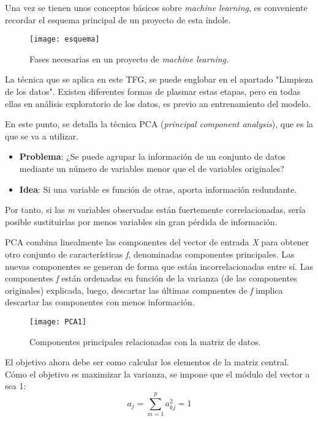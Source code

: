 Una vez se tienen unos conceptos básicos sobre \textit{machine learning}, es conveniente recordar el esquema principal de un proyecto de esta índole.

\begin{figure}[h]
	\centering
	\texttt{[image: esquema]}
	\caption{Fases necesarias en un proyecto de \textit{machine learning.}}
	\label{fig:esquema}
\end{figure}

La técnica que se aplica en este TFG, se puede englobar en el apartado "Limpieza de los datos". Existen diferentes formas de plasmar estas etapas, pero en todas ellas en análisis exploratorio de los datos, es previo an entrenamiento del modelo. \par 

En este punto, se detalla la técnica PCA (\textit{principal component analysis}), que es la que se va a utilizar.\par 

\begin{itemize}
	\item \textbf{Problema}: ¿Se puede agrupar la información de un conjunto de datos mediante un número de variables menor que el de variables originales?
	\item \textbf{Idea}: Si una variable es función de otras, aporta información redundante.
\end{itemize}

Por tanto, si las \textit{m} variables observadas están fuertemente correlacionadas, sería posible sustituirlas por menos variables sin gran pérdida de información.\cite{carlosiii}\par 

PCA combina linealmente las componentes del vector de entrada \textit{X} para obtener otro conjunto de características \textit{f}, denominadas componentes principales. Las nuevas componentes se generan de forma que están incorrelacionadas entre sí.\cite{PCA}
Las componentes \textit{f} están ordenadas en función de la varianza (de las componentes originales) explicada, luego, descartar las últimas compnentes de \textit{f} implica descartar las componentes con menos información.

\begin{figure}[h]
	\centering
	\texttt{[image: PCA1]}
	\caption{Componentes principales relacionadas con la matriz de datos.}
	\label{fig:matriz}
\end{figure}

El objetivo ahora debe ser como calcular los elementos de la matriz central. Cómo el objetivo es maximizar la varianza, se impone que el módulo del vector a sea 1:\cite{PCA}
\begin{equation}\label{eq:vector_a}
	a_{j} = \sum_{m=1}^{p}a_{kj}^2= 1
\end{equation}

